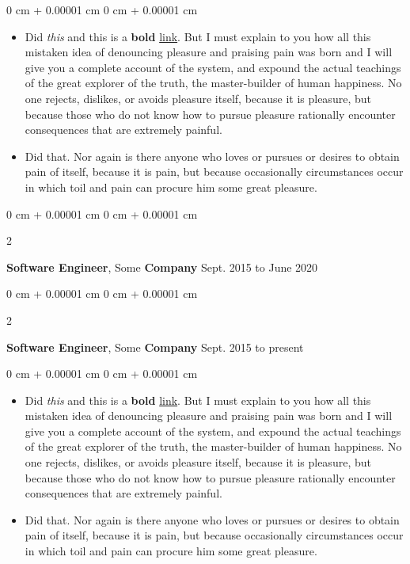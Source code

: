 \documentclass[10pt, letterpaper]{article}
\newenvironment{highlights}{
    \begin{itemize}[
        topsep=0.10 cm,
        parsep=0.10 cm,
        partopsep=0pt,
        itemsep=0pt,
        leftmargin=0 cm + 10pt
    ]
}{
    \end{itemize}
} %
\newenvironment{onecolentry}{
    \begin{adjustwidth}{
        0 cm + 0.00001 cm
    }{
        0 cm + 0.00001 cm
    }
}{
    \end{adjustwidth}
} %
\newenvironment{twocolentry}[2][]{
    \onecolentry
    \def\secondColumn{#2}
    \setcolumnwidth{\fill, 4.5 cm}
    \begin{paracol}{2}
}{
    \switchcolumn \raggedleft \secondColumn
    \end{paracol}
    \endonecolentry
} %
\begin{document}
        \vspace{0.10 cm}
        \begin{onecolentry}
            \begin{highlights}
                \item Did \textit{this} and this is a \textbf{bold} \href{https://example.com}{link}. But I must explain to you how all this mistaken idea of denouncing pleasure and praising pain was born and I will give you a complete account of the system, and expound the actual teachings of the great explorer of the truth, the master-builder of human happiness. No one rejects, dislikes, or avoids pleasure itself, because it is pleasure, but because those who do not know how to pursue pleasure rationally encounter consequences that are extremely painful.
                \item Did that. Nor again is there anyone who loves or pursues or desires to obtain pain of itself, because it is pain, but because occasionally circumstances occur in which toil and pain can procure him some great pleasure.
            \end{highlights}
        \end{onecolentry}


        \vspace{0.2 cm}

        \begin{twocolentry}{
            Sept. 2015 to June 2020
        }
            \textbf{Software Engineer}, Some \textbf{Company}\end{twocolentry}



        \vspace{0.2 cm}

        \begin{twocolentry}{
            Sept. 2015 to present
        }
            \textbf{Software Engineer}, Some \textbf{Company}\end{twocolentry}

        \vspace{0.10 cm}
        \begin{onecolentry}
            \begin{highlights}
                \item Did \textit{this} and this is a \textbf{bold} \href{https://example.com}{link}. But I must explain to you how all this mistaken idea of denouncing pleasure and praising pain was born and I will give you a complete account of the system, and expound the actual teachings of the great explorer of the truth, the master-builder of human happiness. No one rejects, dislikes, or avoids pleasure itself, because it is pleasure, but because those who do not know how to pursue pleasure rationally encounter consequences that are extremely painful.
                \item Did that. Nor again is there anyone who loves or pursues or desires to obtain pain of itself, because it is pain, but because occasionally circumstances occur in which toil and pain can procure him some great pleasure.
            \end{highlights}
        \end{onecolentry}
\end{document}
